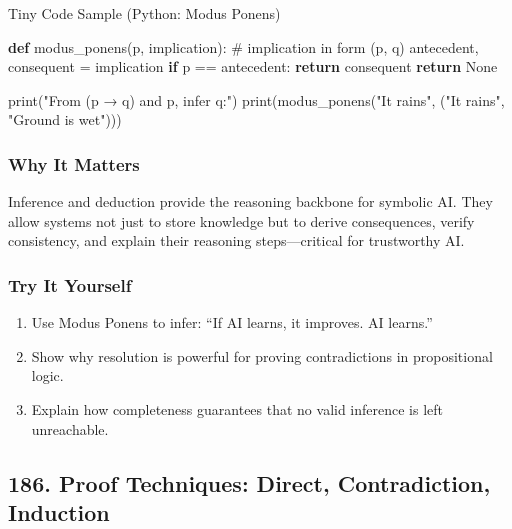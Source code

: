 \documentclass[
  letterpaper,
  DIV=11,
  numbers=noendperiod]{scrreprt}
\newenvironment{Shaded}{\begin{snugshade}}{\end{snugshade}}
\newcommand{\BuiltInTok}[1]{\textcolor[rgb]{0.00,0.23,0.31}{#1}}
\newcommand{\CommentTok}[1]{\textcolor[rgb]{0.37,0.37,0.37}{#1}}
\newcommand{\ControlFlowTok}[1]{\textcolor[rgb]{0.00,0.23,0.31}{\textbf{#1}}}
\newcommand{\KeywordTok}[1]{\textcolor[rgb]{0.00,0.23,0.31}{\textbf{#1}}}
\newcommand{\NormalTok}[1]{\textcolor[rgb]{0.00,0.23,0.31}{#1}}
\newcommand{\OperatorTok}[1]{\textcolor[rgb]{0.37,0.37,0.37}{#1}}
\newcommand{\StringTok}[1]{\textcolor[rgb]{0.13,0.47,0.30}{#1}}
\newcommand{\VariableTok}[1]{\textcolor[rgb]{0.07,0.07,0.07}{#1}}
\providecommand{\tightlist}{%
  \setlength{\itemsep}{0pt}\setlength{\parskip}{0pt}}
\begin{document}
Tiny Code Sample (Python: Modus Ponens)

\begin{Shaded}
\begin{Highlighting}[]
\KeywordTok{def}\NormalTok{ modus\_ponens(p, implication):}
    \CommentTok{\# implication in form (p, q)}
\NormalTok{    antecedent, consequent }\OperatorTok{=}\NormalTok{ implication}
    \ControlFlowTok{if}\NormalTok{ p }\OperatorTok{==}\NormalTok{ antecedent:}
        \ControlFlowTok{return}\NormalTok{ consequent}
    \ControlFlowTok{return} \VariableTok{None}

\BuiltInTok{print}\NormalTok{(}\StringTok{"From (p → q) and p, infer q:"}\NormalTok{)}
\BuiltInTok{print}\NormalTok{(modus\_ponens(}\StringTok{"It rains"}\NormalTok{, (}\StringTok{"It rains"}\NormalTok{, }\StringTok{"Ground is wet"}\NormalTok{)))}
\end{Highlighting}
\end{Shaded}

\subsubsection{Why It Matters}\label{why-it-matters-82}

Inference and deduction provide the reasoning backbone for symbolic AI.
They allow systems not just to store knowledge but to derive
consequences, verify consistency, and explain their reasoning
steps---critical for trustworthy AI.

\subsubsection{Try It Yourself}\label{try-it-yourself-184}

\begin{enumerate}
\def\labelenumi{\arabic{enumi}.}
\tightlist
\item
  Use Modus Ponens to infer: ``If AI learns, it improves. AI learns.''
\item
  Show why resolution is powerful for proving contradictions in
  propositional logic.
\item
  Explain how completeness guarantees that no valid inference is left
  unreachable.
\end{enumerate}

\subsection{186. Proof Techniques: Direct, Contradiction,
Induction}\label{proof-techniques-direct-contradiction-induction}
\end{document}
